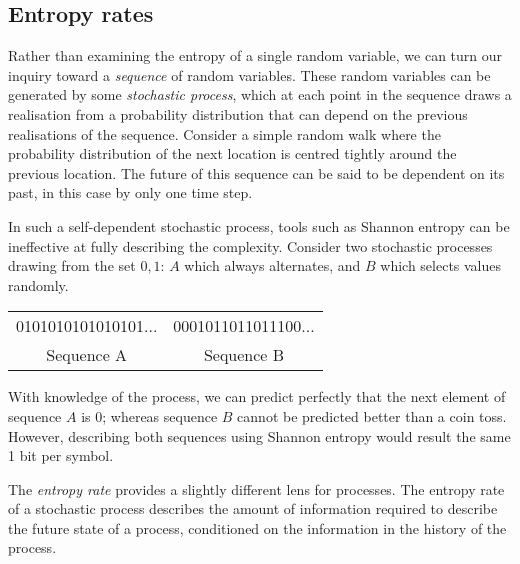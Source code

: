 

\subsection{Entropy rates}\label{sec:entropyrate}

Rather than examining the entropy of a single random variable, we can turn our inquiry toward a \emph{sequence} of random variables. These random variables can be generated by some \emph{stochastic process}, which at each point in the sequence draws a realisation from a probability distribution that can depend on the previous realisations of the sequence. Consider a simple random walk where the probability distribution of the next location is centred tightly around the previous location. The future of this sequence can be said to be dependent on its past, in this case by only one time step.

In such a self-dependent stochastic process, tools such as Shannon entropy can be ineffective at fully describing the complexity. Consider two stochastic processes drawing from the set ${0,1}$: $A$ which always alternates, and $B$ which selects values randomly.

\begin{center}
\begin{tabular}{cc}
0101010101010101...  &  0001011011011100... \\ 
Sequence A & Sequence B \\
\end{tabular}
\end{center}

With knowledge of the process, we can predict perfectly that the next element of sequence $A$ is 0; whereas sequence $B$ cannot be predicted better than a coin toss. However, describing both sequences using Shannon entropy would result the same 1 bit per symbol.

The \emph{entropy rate} provides a slightly different lens for processes. The entropy rate of a stochastic process describes the amount of information required to describe the future state of a process, conditioned on the information in the history of the process.

